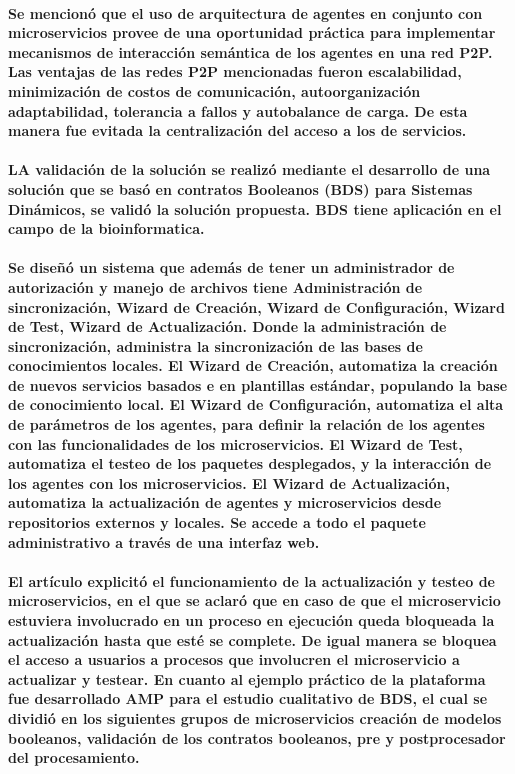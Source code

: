 \paragraph{
    Se mencionó que el uso de arquitectura de agentes en conjunto con microservicios provee de una oportunidad práctica
    para implementar mecanismos de interacción semántica de los agentes en una red P2P.
    Las ventajas de las redes P2P mencionadas fueron escalabilidad, minimización de costos de comunicación,
    autoorganización adaptabilidad, tolerancia a fallos y autobalance de carga.
    De esta manera fue evitada la centralización del acceso a los de servicios.
}

\paragraph{
    LA validación de la solución se realizó mediante el desarrollo de una solución que se basó en contratos Booleanos (BDS) para Sistemas Dinámicos,
    se validó la solución propuesta.
    BDS tiene aplicación en el campo de la bioinformatica.
}

\paragraph{
    Se diseñó un sistema que además de tener un administrador de autorización y manejo de archivos tiene
    Administración de sincronización, Wizard de Creación, Wizard de Configuración, Wizard de Test, Wizard de Actualización. Donde la administración de sincronización, administra la sincronización de las bases de conocimientos locales. El Wizard de Creación, automatiza la creación de nuevos servicios basados e en plantillas estándar,
    populando la base de conocimiento local. El Wizard de Configuración, automatiza el alta de parámetros de los agentes,
    para definir la relación de los agentes con las funcionalidades de los microservicios. El Wizard de Test, automatiza el testeo de los paquetes desplegados, y la interacción de los agentes con los microservicios. El Wizard de Actualización, automatiza la actualización de agentes y microservicios desde repositorios externos y locales.
    Se accede a todo el paquete administrativo a través de una interfaz web.
}

\paragraph{
    El artículo explicitó el funcionamiento de la actualización y testeo de microservicios,
    en el que se aclaró que en caso de que el microservicio estuviera involucrado
    en un proceso en ejecución queda bloqueada la actualización hasta que esté se complete.
    De igual manera se bloquea el acceso a usuarios a procesos que involucren el microservicio a actualizar y testear.
    En cuanto al ejemplo práctico de la plataforma fue desarrollado AMP para el estudio cualitativo de BDS,
    el cual se dividió en los siguientes grupos de microservicios creación de modelos booleanos, validación de los contratos booleanos, pre y postprocesador del procesamiento.
}

